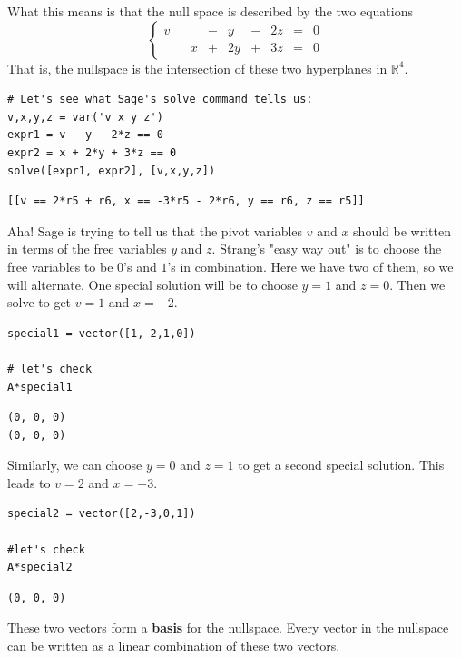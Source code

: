 \documentclass[10pt,]{book}
\newcommand{\terminology}[1]{\textbf{#1}}
\theoremstyle{plain}
\theoremstyle{definition}
\numberwithin{equation}{section}
\begin{document}
      What this means is that the null space is described by the two equations
      \[
        \left\{
        \begin{array}{rrrrrrrrr}
        v & & & - & y & - & 2 z & = & 0 \\
          & & x & + & 2y & + & 3 z & = & 0
        \end{array}\right.
      \]
      That is, the nullspace is the intersection of these two hyperplanes in
      \(\mathbb{R}^4\).
\begin{lstlisting}[style=sageinput]
# Let's see what Sage's solve command tells us:
v,x,y,z = var('v x y z')
expr1 = v - y - 2*z == 0
expr2 = x + 2*y + 3*z == 0
solve([expr1, expr2], [v,x,y,z])
\end{lstlisting}
\begin{lstlisting}[style=sageoutput]
[[v == 2*r5 + r6, x == -3*r5 - 2*r6, y == r6, z == r5]]
\end{lstlisting}
\par

      Aha! Sage is trying to tell us that the pivot variables \(v\)
      and \(x\) should be
      written in terms of the free variables \(y\) and \(z\).
      Strang's "easy way out" is to choose the free variables to be
      \(0\)'s and \(1\)'s in
      combination. Here we have two of them, so we will alternate.
      One special solution will be to choose \(y = 1\) and \(z=0\).
      Then we solve to get \(v = 1\) and \(x = -2\).
\begin{lstlisting}[style=sageinput]
special1 = vector([1,-2,1,0])

# let's check
A*special1
\end{lstlisting}
\begin{lstlisting}[style=sageoutput]
(0, 0, 0)
(0, 0, 0)
\end{lstlisting}
\par

      Similarly, we can choose \(y=0\) and
      \(z=1\) to get a second special solution. This leads to
      \(v=2\) and \(x = -3\).
\begin{lstlisting}[style=sageinput]
special2 = vector([2,-3,0,1])

#let's check
A*special2
\end{lstlisting}
\begin{lstlisting}[style=sageoutput]
(0, 0, 0)
\end{lstlisting}
\par

      These two vectors form a \terminology{basis} for the nullspace. Every
      vector in the nullspace can be written as a linear combination of
      these two vectors.
\par
\end{document}

